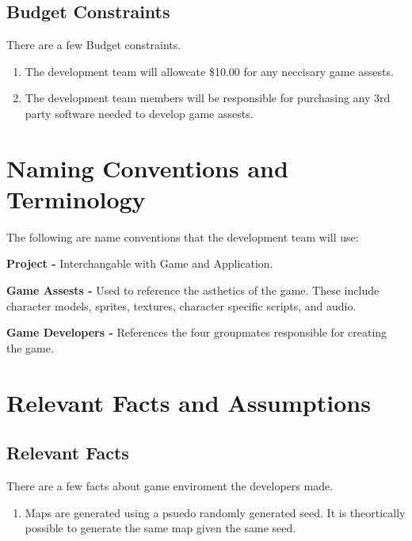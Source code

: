 \documentclass{article}
\begin{document}
\subsection{Budget Constraints}
\quad There are a few Budget constraints.
\begin{enumerate}[{BC}1. ]
	\item The development team will allowcate \$10.00 for any neccisary game assests.
	\item The development team members will be responsible for purchasing any 3rd party software needed to develop game assests.
\end{enumerate}
\section{Naming Conventions and Terminology}
\quad The following are name conventions that the development team will use: \par
\textbf{Project - }Interchangable with Game and Application. \par
\textbf{Game Assests - }Used to reference the asthetics of the game. These include character models, sprites, textures, character specific scripts, and audio. \par
\textbf{Game Developers - }References the four groupmates responsible for creating the game. \par

\section{Relevant Facts and Assumptions}
\subsection{Relevant Facts}
\quad There are a few facts about game enviroment the developers made.
\begin{enumerate}[{RF}1. ]
	\item Maps are generated using a psuedo randomly generated seed. It is theortically possible to generate the same map given the same seed.
\end{enumerate}
\end{document}
